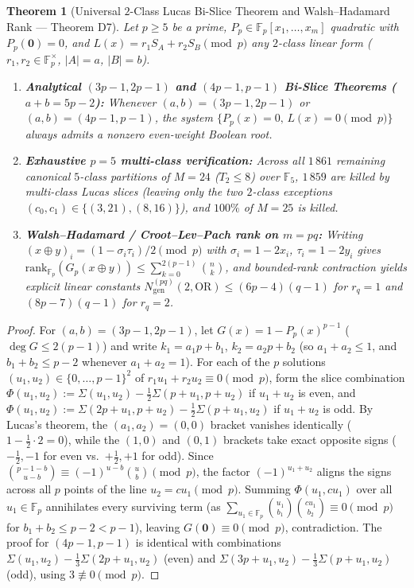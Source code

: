 \documentclass[11pt,a4paper]{article}
\newtheorem{theorem}{Theorem}[section]
\theoremstyle{definition}
\newcommand{\F}{\mathbb{F}}
\newcommand{\OR}{\mathrm{OR}}
\newcommand{\Ngen}{N_{\mathrm{gen}}}
\begin{document}
\begin{theorem}[Universal $2$-Class Lucas Bi-Slice Theorem and Walsh--Hadamard Rank --- Theorem D7]
\label{thm:d7}
Let $p \ge 5$ be a prime, $P_p \in \F_p[x_1,\dots,x_m]$ quadratic with $P_p(\mathbf{0}) = 0$, and $L(x) = r_1 S_A + r_2 S_B \pmod p$ any $2$-class linear form ($r_1, r_2 \in \F_p^\times$, $|A| = a$, $|B| = b$).
\begin{enumerate}[leftmargin=*,nosep]
  \item \textbf{Analytical $(3p - 1, 2p - 1)$ and $(4p - 1, p - 1)$ Bi-Slice Theorems ($a + b = 5p - 2$):} Whenever $(a, b) = (3p - 1, 2p - 1)$ or $(a, b) = (4p - 1, p - 1)$, the system $\{P_p(x) = 0,\, L(x) = 0 \pmod p\}$ \emph{always} admits a nonzero even-weight Boolean root.
  \item \textbf{Exhaustive $p = 5$ multi-class verification:} Across all $1\,861$ remaining canonical $5$-class partitions of $M = 24$ ($T_2 \le 8$) over $\F_5$, $1\,859$ are killed by multi-class Lucas slices (leaving only the two $2$-class exceptions $(c_0, c_1) \in \{(3, 21), (8, 16)\}$), and $100\%$ of $M = 25$ is killed.
  \item \textbf{Walsh--Hadamard / Croot--Lev--Pach rank on $m = pq$:} Writing $(x \oplus y)_i = (1 - \sigma_i \tau_i)/2 \pmod p$ with $\sigma_i = 1 - 2x_i$, $\tau_i = 1 - 2y_i$ gives $\mathrm{rank}_{\F_p}(G_p(x \oplus y)) \le \sum_{k=0}^{2(p-1)} \binom{n}{k}$, and bounded-rank contraction yields explicit linear constants $\Ngen^{(pq)}(2, \OR) \le (6p - 4)(q - 1)$ for $r_q = 1$ and $(8p - 7)(q - 1)$ for $r_q = 2$.
\end{enumerate}
\end{theorem}

\begin{proof}
For $(a, b) = (3p - 1, 2p - 1)$, let $G(x) = 1 - P_p(x)^{p-1}$ ($\deg G \le 2(p-1)$) and write $k_1 = a_1 p + b_1$, $k_2 = a_2 p + b_2$ (so $a_1 + a_2 \le 1$, and $b_1 + b_2 \le p - 2$ whenever $a_1 + a_2 = 1$). For each of the $p$ solutions $(u_1, u_2) \in \{0,\dots,p-1\}^2$ of $r_1 u_1 + r_2 u_2 \equiv 0 \pmod p$, form the slice combination $\Phi(u_1, u_2) := \Sigma(u_1, u_2) - \frac{1}{2}\Sigma(p + u_1, p + u_2)$ if $u_1 + u_2$ is even, and $\Phi(u_1, u_2) := \Sigma(2p + u_1, p + u_2) - \frac{1}{2}\Sigma(p + u_1, u_2)$ if $u_1 + u_2$ is odd. By Lucas's theorem, the $(a_1, a_2) = (0, 0)$ bracket vanishes identically ($1 - \frac{1}{2}\cdot 2 = 0$), while the $(1, 0)$ and $(0, 1)$ brackets take exact opposite signs ($-\frac{1}{2}, -1$ for even vs.\ $+\frac{1}{2}, +1$ for odd). Since $\binom{p-1-b}{u-b} \equiv (-1)^{u-b}\binom{u}{b} \pmod p$, the factor $(-1)^{u_1+u_2}$ aligns the signs across all $p$ points of the line $u_2 = c u_1 \pmod p$. Summing $\Phi(u_1, c u_1)$ over all $u_1 \in \F_p$ annihilates every surviving term (as $\sum_{u_1 \in \F_p} \binom{u_1}{b_1}\binom{c u_1}{b_2} \equiv 0 \pmod p$ for $b_1 + b_2 \le p - 2 < p - 1$), leaving $G(\mathbf{0}) \equiv 0 \pmod p$, contradiction. The proof for $(4p - 1, p - 1)$ is identical with combinations $\Sigma(u_1, u_2) - \frac{1}{3}\Sigma(2p+u_1, u_2)$ (even) and $\Sigma(3p+u_1, u_2) - \frac{1}{3}\Sigma(p+u_1, u_2)$ (odd), using $3 \not\equiv 0 \pmod p$.
\end{proof}
\end{document}
